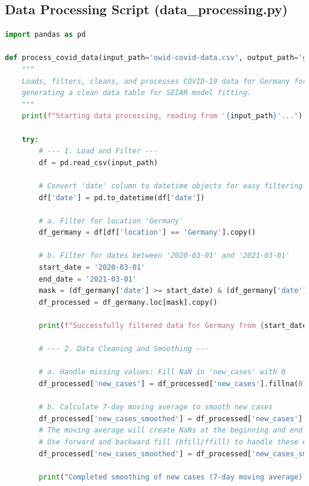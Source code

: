 \documentclass[12pt, a4paper]{article}
\begin{document}
\subsection{Data Processing Script (data\_processing.py)}
\begin{lstlisting}[language=Python, caption=Python script for processing raw OWID data into a clean dataset for Germany.]
import pandas as pd

def process_covid_data(input_path='owid-covid-data.csv', output_path='germany_covid_processed.csv'):
    """
    Loads, filters, cleans, and processes COVID-19 data for Germany for a specific period,
    generating a clean data table for SEIAR model fitting.
    """
    print(f"Starting data processing, reading from '{input_path}'...")

    try:
        # --- 1. Load and Filter ---
        df = pd.read_csv(input_path)

        # Convert 'date' column to datetime objects for easy filtering
        df['date'] = pd.to_datetime(df['date'])

        # a. Filter for location 'Germany'
        df_germany = df[df['location'] == 'Germany'].copy()

        # b. Filter for dates between '2020-03-01' and '2021-03-01'
        start_date = '2020-03-01'
        end_date = '2021-03-01'
        mask = (df_germany['date'] >= start_date) & (df_germany['date'] <= end_date)
        df_processed = df_germany.loc[mask].copy()
        
        print(f"Successfully filtered data for Germany from {start_date} to {end_date}.")

        # --- 2. Data Cleaning and Smoothing ---

        # a. Handle missing values: Fill NaN in 'new_cases' with 0
        df_processed['new_cases'] = df_processed['new_cases'].fillna(0)

        # b. Calculate 7-day moving average to smooth new cases
        df_processed['new_cases_smoothed'] = df_processed['new_cases'].rolling(window=7, center=True).mean()
        # The moving average will create NaNs at the beginning and end of the series, which we need to fill
        # Use forward and backward fill (bfill/ffill) to handle these edge cases
        df_processed['new_cases_smoothed'] = df_processed['new_cases_smoothed'].fillna(method='bfill').fillna(method='ffill')
        
        print("Completed smoothing of new cases (7-day moving average).")


\end{lstlisting}
\end{document}
